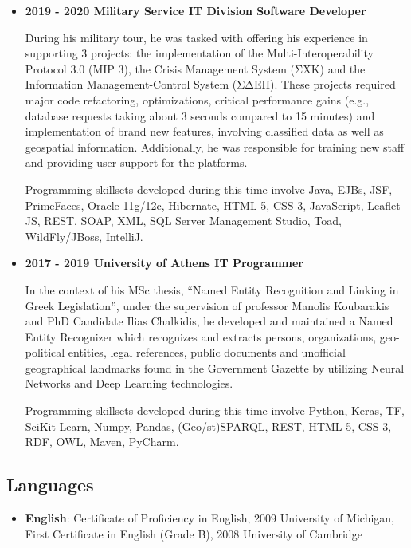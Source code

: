 \documentclass[a4paper,oneside,10pt]{article}
\begin{document}
	\begin{itemize}

		\item \textbf{2019 - 2020 Military Service IT Division Software Developer}

			During his military tour, he was tasked with offering his experience in supporting 3 projects: the implementation of the Multi-Interoperability Protocol 3.0 (MIP 3), the Crisis Management System (ΣΧΚ) and the Information Management-Control System (ΣΔΕΠ). These projects required major code refactoring, optimizations, critical performance gains (e.g., database requests taking about 3 seconds compared to 15 minutes) and implementation of brand new features, involving classified data as well as geospatial information. Additionally, he was responsible for training new staff and providing user support for the platforms.

			Programming skillsets developed during this time involve Java, EJBs, JSF, PrimeFaces, Oracle 11g/12c, Hibernate, HTML 5, CSS 3, JavaScript, Leaflet JS, REST, SOAP, XML, SQL Server Management Studio, Toad, WildFly/JBoss, IntelliJ.

		\item \textbf{2017 - 2019 University of Athens IT Programmer}

			In the context of his MSc thesis, ``Named Entity Recognition and Linking in Greek Legislation'', under the supervision of professor Manolis Koubarakis and PhD Candidate Ilias Chalkidis, he developed and maintained a Named Entity Recognizer which recognizes and extracts persons, organizations, geo-political entities, legal references, public documents and unofficial geographical landmarks found in the Government Gazette by utilizing Neural Networks and Deep Learning technologies.

			Programming skillsets developed during this time involve Python, Keras, TF, SciKit Learn, Numpy, Pandas, (Geo/st)SPARQL, REST, HTML 5, CSS 3, RDF, OWL, Maven, PyCharm.

	\end{itemize}

\subsection*{Languages}

	\begin{itemize}

		\item \textbf{English}: Certificate of Proficiency in English, 2009 University of Michigan, First Certificate in English (Grade B), 2008 University of Cambridge

	\end{itemize}	
\end{document}
